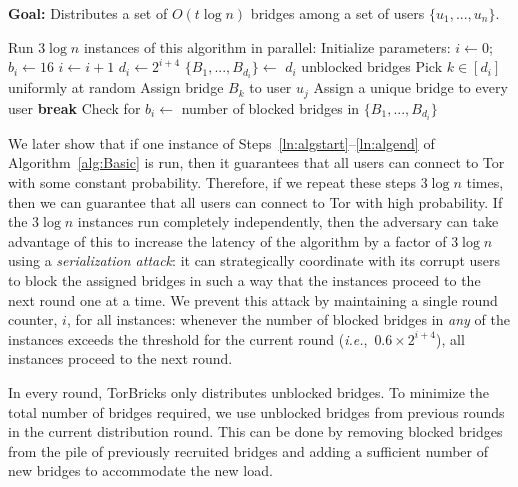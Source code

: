 \documentclass[USenglish,oneside,twocolumn]{article}
\newcommand{\ie}{\textit{i.e.}}
\newcommand{\algFont}{\fontsize{10}{13}\selectfont}
\newcommand{\bricks}{}
\def\bricks/{\textsf{\sfsize \mbox{TorBricks}}}
\newcommand{\sfsize}{\fontsize{0.68\baselineskip}{0.68\baselineskip}\selectfont}
\begin{document}
\begin{algorithm}[t]
	\caption{\bricks/ -- Basic Algorithm}
	\label{alg:Basic}
	\vspace{0.4em}
	\textbf{Goal:} Distributes a set of $O(t\log{n})$ bridges among a set of users $\{u_1,...,u_n\}$.
	
	\algFont \vspace{2pt}
	\begin{algorithmic}[1]
		\Statex \hspace{-\algorithmicindent} Run $3\log{n}$ instances of this algorithm in parallel:
		\State Initialize parameters: ${i \gets 0}$; ${b_i \gets 16}$  \label{ln:algstart}
		\While{\True}
			 \label{ln:ConditionSimple}
				\State $i \gets i+1$ \label{ln:IncrementSimple}
				\State $d_i \gets 2^{i+4}$
					\State $\{B_1,...,B_{d_i}\} \gets$ $d_i$ unblocked bridges \label{ln:RecruitBridges}						
						\State Pick $k \in [d_i]$ uniformly at random 
						\State Assign bridge $B_{k}$ to user $u_j$				
					\EndFor			
				\Else
					\State Assign a unique bridge to every user
					\State \textbf{break}
				\EndIf
			\EndIf
			\State 
			\State Check for $b_i \gets$ number of blocked bridges in $\{B_1,...,B_{d_i}\}$
		\EndWhile	\label{ln:algend}
	\end{algorithmic}	
\end{algorithm}

We later show that if one instance of Steps~\ref{ln:algstart}--\ref{ln:algend} of Algorithm~\ref{alg:Basic} is run, then it guarantees that all users can connect to Tor with some constant probability. Therefore, if we repeat these steps ${3\log{n}}$ times, then we can guarantee that all users can connect to Tor with high probability.
If the $3\log{n}$ instances run completely independently, then the adversary can take advantage of this to increase the latency of the algorithm by a factor of $3\log{n}$ using a \emph{serialization attack}: it can strategically coordinate with its corrupt users to block the assigned bridges in such a way that the instances proceed to the next round one at a time. 
We prevent this attack by maintaining a single round counter, $i$, for all instances: whenever the number of blocked bridges in \emph{any} of the instances exceeds the threshold for the current round (\ie,~${0.6 \times 2^{i+4}}$), all instances proceed to the next round.

In every round, \bricks/ only distributes unblocked bridges. To minimize the total number of bridges required, we use unblocked bridges from previous rounds in the current distribution round. This can be done by removing blocked bridges from the pile of previously recruited bridges and adding a sufficient number of new bridges to accommodate the new load.
\end{document}
